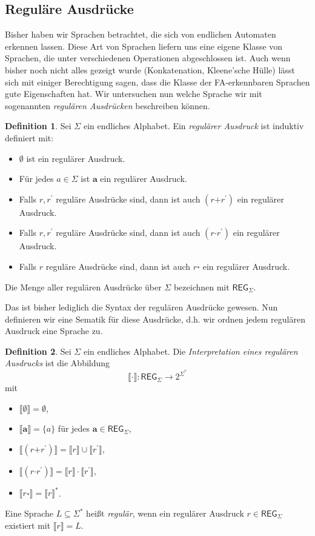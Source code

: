 \documentclass[11pt, a4paper]{article}
\theoremstyle{definition}
\newtheorem{definition}{Definition}[section]
\theoremstyle{plain}
\numberwithin{equation}{section}
\begin{document}
\subsection{Reguläre Ausdrücke}\label{sec:regular_regexp}
Bisher haben wir Sprachen betrachtet, die sich von endlichen Automaten erkennen lassen. Diese Art von Sprachen liefern uns eine eigene Klasse von Sprachen, die unter verschiedenen Operationen abgeschlossen ist. Auch wenn bisher noch nicht alles gezeigt wurde (Konkatenation, Kleene'sche Hülle) lässt sich mit einiger Berechtigung sagen, dass die Klasse der FA-erkennbaren Sprachen gute Eigenschaften hat. Wir untersuchen nun welche Sprache wir mit sogenannten \textit{regulären Ausdrücken} beschreiben können.
\begin{definition}
	Sei \( \Sigma \) ein endliches Alphabet. Ein \textit{regulärer Ausdruck} ist induktiv definiert mit:
	\begin{itemize}
		\item \( \bm{\emptyset} \) ist ein regulärer Ausdruck.
		\item Für jedes \( a \in \Sigma \) ist \( \bm{a} \) ein regulärer Ausdruck.
		\item Falls \( r, r^\prime \) reguläre Ausdrücke sind, dann ist auch \( (r \bm{+} r^\prime) \) ein regulärer Ausdruck.
		\item Falls \( r, r^\prime \) reguläre Ausdrücke sind, dann ist auch \( (r \bm{\cdot} r^\prime) \) ein regulärer Ausdruck.
		\item Falls \( r \) reguläre Ausdrücke sind, dann ist auch \( r \overset{\bm{\ast}}{} \) ein regulärer Ausdruck.
	\end{itemize}
	Die Menge aller regulären Ausdrücke über \( \Sigma \) bezeichnen mit \( \mathsf{REG}_\Sigma \).
\end{definition}
Das ist bisher lediglich die Syntax der regulären Ausdrücke gewesen. Nun definieren wir eine Sematik für diese Ausdrücke, d.h. wir ordnen jedem regulären Ausdruck eine Sprache zu.
\begin{definition}
	Sei \( \Sigma \) ein endliches Alphabet. Die \textit{Interpretation eines regulären Ausdrucks} ist die Abbildung
	\[
		\llbracket \cdot \rrbracket: \mathsf{REG}_\Sigma \to 2^{\Sigma^\ast}
	\]
	mit
	\begin{itemize}
		\item \( \llbracket \bm{\emptyset} \rrbracket = \emptyset \),
		\item \( \llbracket \bm{a} \rrbracket = \{ a \} \) für jedes \( \bm{a} \in \mathsf{REG}_\Sigma \),
		\item \( \llbracket (r \bm{+} r^\prime) \rrbracket = \llbracket r \rrbracket \cup \llbracket r^\prime \rrbracket \),
		\item \( \llbracket (r \bm{\cdot} r^\prime) \rrbracket = \llbracket r \rrbracket \cdot \llbracket r^\prime \rrbracket \),
		\item \( \llbracket r \overset{\bm{\ast}}{} \rrbracket = \llbracket r \rrbracket^\ast \).
	\end{itemize}
	Eine Sprache \( L \subseteq \Sigma^\ast \) heißt \textit{regulär}, wenn ein regulärer Ausdruck \( r \in \mathsf{REG}_\Sigma \) existiert mit \( \llbracket r \rrbracket = L \).
\end{definition}
\end{document}
